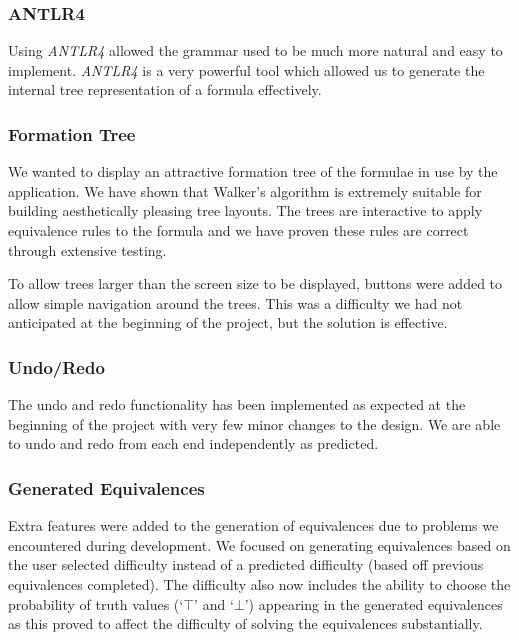 \documentclass[draft]{report}
\begin{document}
\subsubsection{ANTLR4}

Using \emph{ANTLR4} allowed the grammar used to be much more natural and easy to implement. \emph{ANTLR4} is a very powerful tool which allowed us to generate the internal tree representation of a formula effectively.

\subsubsection{Formation Tree}

We wanted to display an attractive formation tree of the formulae in use by the application. We have shown that Walker's algorithm is extremely suitable for building aesthetically pleasing tree layouts. The trees are interactive to apply equivalence rules to the formula and we have proven these rules are correct through extensive testing. 

To allow trees larger than the screen size to be displayed, buttons were added to allow simple navigation around the trees. This was a difficulty we had not anticipated at the beginning of the project, but the solution is effective.

\subsubsection{Undo/Redo}

The undo and redo functionality has been implemented as expected at the beginning of the project with very few minor changes to the design. We are able to undo and redo from each end independently as predicted.

\subsubsection{Generated Equivalences}

Extra features were added to the generation of equivalences due to problems we encountered during development. We focused on generating equivalences based on the user selected difficulty instead of a predicted difficulty (based off previous equivalences completed). The difficulty also now includes the ability to choose the probability of truth values (`$\top$' and `$\bot$') appearing in the generated equivalences as this proved to affect the difficulty of solving the equivalences substantially.
\end{document}

